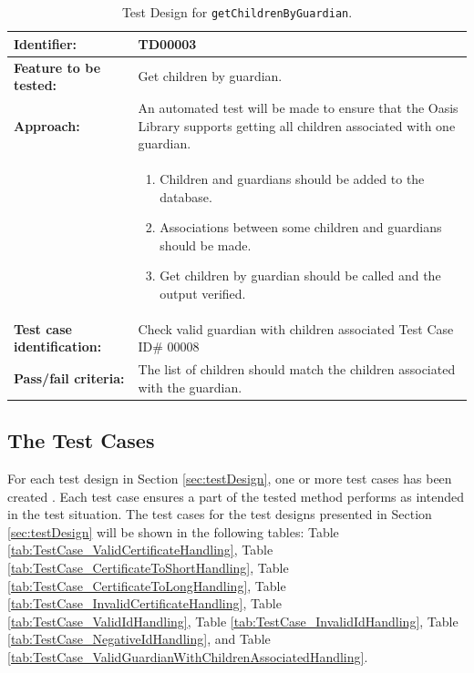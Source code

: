 \begin{table}[htbp]
	\centering
		\begin{tabular}{| p{4.5cm} | m{9cm} |}
			\hline
			\textbf{Identifier:} 				& TD00003 \\ \hline
			\textbf{Feature to be tested:}		& Get children by guardian. \\ \hline
			\textbf{Approach:}					& An automated test will be made to ensure that the Oasis Library supports getting all children associated with one guardian. \\
										&	\begin{enumerate}
												\item Children and guardians should be added to the database.
												\item Associations between some children and guardians should be made.
												\item Get children by guardian should be called and the output verified.
											\end{enumerate} \\ \hline
			\textbf{Test case identification:} 	& Check valid guardian with children associated Test Case ID\# 00008 \\ \hline
			\textbf{Pass/fail criteria:}			& The list of children should match the children associated with the guardian. \\ \hline
		\end{tabular}
	\caption{Test Design for \texttt{getChildrenByGuardian}.}
	\label{tab:TestDesign_GetChildrenByGuardian}
\end{table}



\subsection{The Test Cases}
For each test design in Section \vref{sec:testDesign}, one or more test cases has been created \cite[pp283]{Testing}.
Each test case ensures a part of the tested method performs as intended in the test situation.
The test cases for the test designs presented in Section \vref{sec:testDesign} will be shown in the following tables:
Table \vref{tab:TestCase_ValidCertificateHandling}, 
Table \vref{tab:TestCase_CertificateToShortHandling},
Table \vref{tab:TestCase_CertificateToLongHandling},
Table \vref{tab:TestCase_InvalidCertificateHandling},
Table \vref{tab:TestCase_ValidIdHandling},
Table \vref{tab:TestCase_InvalidIdHandling},
Table \vref{tab:TestCase_NegativeIdHandling}, 
and Table \vref{tab:TestCase_ValidGuardianWithChildrenAssociatedHandling}.


